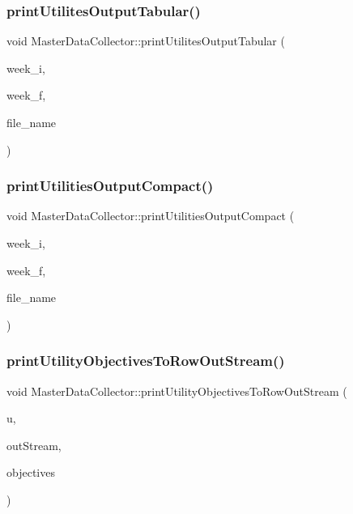 \subsubsection{\texorpdfstring{print\+Utilites\+Output\+Tabular()}{printUtilitesOutputTabular()}}
{\footnotesize\ttfamily void Master\+Data\+Collector\+::print\+Utilites\+Output\+Tabular (\begin{DoxyParamCaption}\item[{int}]{week\+\_\+i,  }\item[{int}]{week\+\_\+f,  }\item[{string}]{file\+\_\+name }\end{DoxyParamCaption})}

\mbox{\label{classMasterDataCollector_a7effc4567580a12567a46dd3f195dbac}} 
\subsubsection{\texorpdfstring{print\+Utilities\+Output\+Compact()}{printUtilitiesOutputCompact()}}
{\footnotesize\ttfamily void Master\+Data\+Collector\+::print\+Utilities\+Output\+Compact (\begin{DoxyParamCaption}\item[{int}]{week\+\_\+i,  }\item[{int}]{week\+\_\+f,  }\item[{string}]{file\+\_\+name }\end{DoxyParamCaption})}

\mbox{\label{classMasterDataCollector_ae8c802f81045c613c065abc9705d0145}} 
\subsubsection{\texorpdfstring{print\+Utility\+Objectives\+To\+Row\+Out\+Stream()}{printUtilityObjectivesToRowOutStream()}}
{\footnotesize\ttfamily void Master\+Data\+Collector\+::print\+Utility\+Objectives\+To\+Row\+Out\+Stream (\begin{DoxyParamCaption}\item[{vector$<$ \mbox{\hyperlink{classUtilitiesDataCollector}{Utilities\+Data\+Collector}} $\ast$$>$ \&}]{u,  }\item[{std\+::ofstream \&}]{out\+Stream,  }\item[{vector$<$ double $>$ \&}]{objectives }\end{DoxyParamCaption})}

